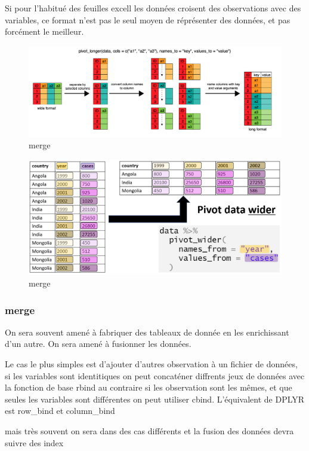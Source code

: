 \documentclass[
]{book}
\begin{document}
Si pour l'habitué des feuilles excell les données croisent des observations avec des variables, ce format n'est pas le seul moyen de réprésenter des données, et pas forcément le meilleur.

\begin{figure}
\centering
\includegraphics{./Images/pivot_longer.png}
\caption{merge}
\end{figure}

\begin{figure}
\centering
\includegraphics{./Images/pivot_wider.png}
\caption{merge}
\end{figure}

\hypertarget{merge}{%
\subsubsection{merge}\label{merge}}

On sera souvent amené à fabriquer des tableaux de donnée en les enrichissant d'un autre. On sera amené à fusionner les données.

Le cas le plus simples est d'ajouter d'autres observation à un fichier de données, si les variables sont identitiques on peut concaténer diffrents jeux de données avec la fonction de base rbind au contraire si les observation sont les mêmes, et que seules les variables sont différentes on peut utiliser cbind. L'équivalent de DPLYR est row\_bind et column\_bind

mais très souvent on sera dans des cas différents et la fusion des données devra suivre des index
\end{document}
